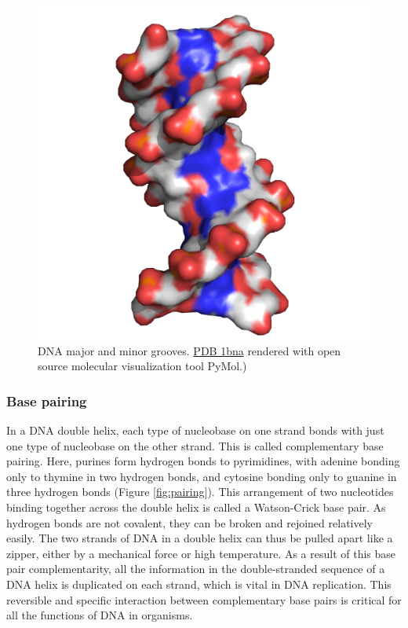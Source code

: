 \begin{figure}

{\centering \includegraphics[width=0.7\linewidth]{./figures/dna/dna_solid} 

}

\caption{DNA major and minor grooves. \href{https://www.rcsb.org/structure/1bna}{PDB 1bna} rendered with open source molecular visualization tool PyMol.)}\label{fig:groove}
\end{figure}

\hypertarget{base-pairing}{%
\subsubsection{Base pairing}\label{base-pairing}}

In a DNA double helix, each type of nucleobase on one strand bonds with just one type of nucleobase on the other strand. This is called complementary base pairing. Here, purines form hydrogen bonds to pyrimidines, with adenine bonding only to thymine in two hydrogen bonds, and cytosine bonding only to guanine in three hydrogen bonds (Figure \ref{fig:pairing}). This arrangement of two nucleotides binding together across the double helix is called a Watson-Crick base pair. As hydrogen bonds are not covalent, they can be broken and rejoined relatively easily. The two strands of DNA in a double helix can thus be pulled apart like a zipper, either by a mechanical force or high temperature. As a result of this base pair complementarity, all the information in the double-stranded sequence of a DNA helix is duplicated on each strand, which is vital in DNA replication. This reversible and specific interaction between complementary base pairs is critical for all the functions of DNA in organisms.




